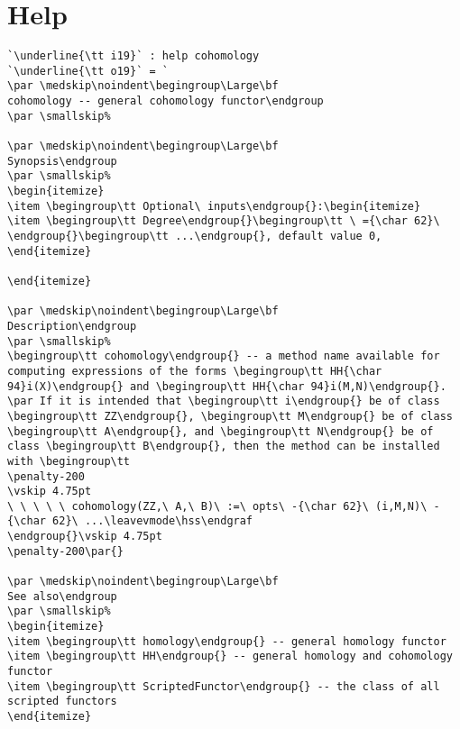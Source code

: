 \documentclass[12pt,a4paper]{amsart}
\begin{document}
\section{Help}
\begin{lstlisting}[language=Macaulay2output]
`\underline{\tt i19}` : help cohomology
`\underline{\tt o19}` = `
\par \medskip\noindent\begingroup\Large\bf
cohomology -- general cohomology functor\endgroup
\par \smallskip%

\par \medskip\noindent\begingroup\Large\bf
Synopsis\endgroup
\par \smallskip%
\begin{itemize}
\item \begingroup\tt Optional\ inputs\endgroup{}:\begin{itemize}
\item \begingroup\tt Degree\endgroup{}\begingroup\tt \ ={\char 62}\ \endgroup{}\begingroup\tt ...\endgroup{}, default value 0, 
\end{itemize}

\end{itemize}

\par \medskip\noindent\begingroup\Large\bf
Description\endgroup
\par \smallskip%
\begingroup\tt cohomology\endgroup{} -- a method name available for computing expressions of the forms \begingroup\tt HH{\char 94}i(X)\endgroup{} and \begingroup\tt HH{\char 94}i(M,N)\endgroup{}.
\par If it is intended that \begingroup\tt i\endgroup{} be of class \begingroup\tt ZZ\endgroup{}, \begingroup\tt M\endgroup{} be of class \begingroup\tt A\endgroup{}, and \begingroup\tt N\endgroup{} be of class \begingroup\tt B\endgroup{}, then the method can be installed with \begingroup\tt 
\penalty-200
\vskip 4.75pt
\ \ \ \ \ cohomology(ZZ,\ A,\ B)\ :=\ opts\ -{\char 62}\ (i,M,N)\ -{\char 62}\ ...\leavevmode\hss\endgraf
\endgroup{}\vskip 4.75pt
\penalty-200\par{}

\par \medskip\noindent\begingroup\Large\bf
See also\endgroup
\par \smallskip%
\begin{itemize}
\item \begingroup\tt homology\endgroup{} -- general homology functor
\item \begingroup\tt HH\endgroup{} -- general homology and cohomology functor
\item \begingroup\tt ScriptedFunctor\endgroup{} -- the class of all scripted functors
\end{itemize}


\end{lstlisting}
\end{document}
